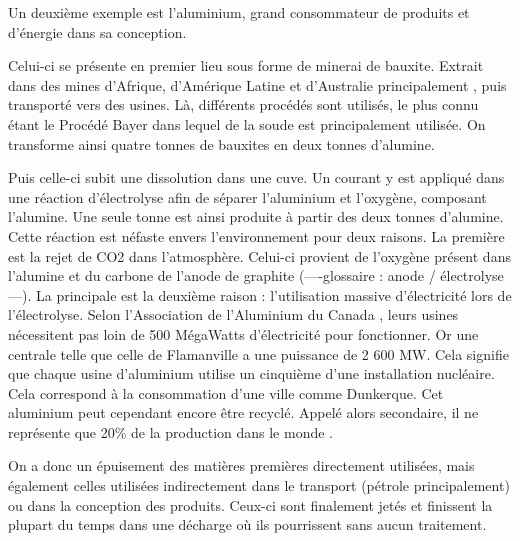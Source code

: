 \medbreak Un deuxième exemple est l'aluminium, grand consommateur de produits et d’énergie dans sa conception.

Celui-ci se présente en premier lieu sous forme de minerai de bauxite. Extrait dans des mines d'Afrique, d'Amérique Latine et d'Australie principalement \cite{aluZonesExtraction}, puis transporté vers des usines. Là, différents procédés sont utilisés, le plus connu étant le Procédé Bayer dans lequel de la soude est principalement utilisée. On transforme ainsi quatre tonnes de bauxites en deux tonnes d'alumine. 

Puis celle-ci subit une dissolution dans une cuve. Un courant y est appliqué dans une réaction d'électrolyse afin de séparer l'aluminium et l'oxygène, composant l'alumine. Une seule tonne est ainsi produite à partir des deux tonnes d'alumine. Cette réaction est néfaste envers l'environnement pour deux raisons. La première est la rejet de CO2 dans l'atmosphère. Celui-ci provient de l'oxygène présent dans l'alumine et du carbone de l'anode de graphite (----glossaire : anode / électrolyse ---). La principale est la deuxième raison : l'utilisation massive d’électricité lors de l'électrolyse. Selon l'Association de l'Aluminium du Canada \cite{consomUsinesAlu}, leurs usines nécessitent pas loin de 500 MégaWatts d’électricité pour fonctionner. Or une centrale telle que celle de Flamanville a une puissance de 2 600 MW. Cela signifie que chaque usine d'aluminium utilise un cinquième d'une installation nucléaire. Cela correspond à la consommation d'une ville comme Dunkerque.
Cet aluminium peut cependant encore être recyclé. Appelé alors secondaire, il ne représente que 20\% de la production dans le monde \cite{worldAluProdRecycl}. 

\bigbreak On a donc un épuisement des matières premières directement utilisées, mais également celles utilisées indirectement dans le transport (pétrole principalement) ou dans la conception des produits. Ceux-ci sont finalement jetés et finissent la plupart du temps dans une décharge où ils pourrissent sans aucun traitement.

